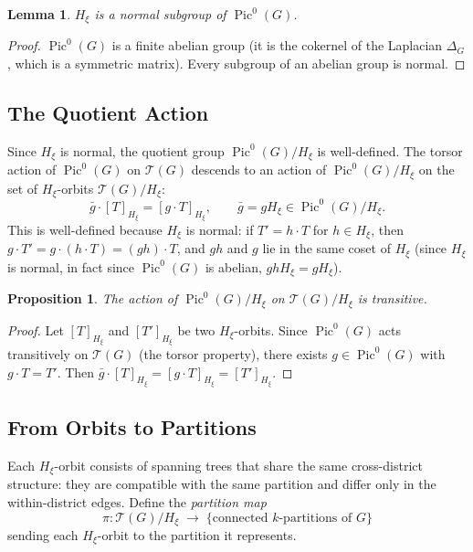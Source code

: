 \documentclass[11pt]{article}
\newtheorem{proposition}{Proposition}[section]
\newtheorem{lemma}{Lemma}[section]
\newcommand{\Pic}{\operatorname{Pic}^0}
\begin{document}
\begin{lemma}\label{lem:normal}
$H_\xi$ is a normal subgroup of $\Pic(G)$.
\end{lemma}

\begin{proof}
$\Pic(G)$ is a finite abelian group (it is the cokernel of the Laplacian
$\Delta_G$, which is a symmetric matrix). Every subgroup of an abelian group
is normal.
\end{proof}

\subsection{The Quotient Action}

Since $H_\xi$ is normal, the quotient group $\Pic(G) / H_\xi$ is
well-defined. The torsor action of $\Pic(G)$ on $\mathcal{T}(G)$ descends to
an action of $\Pic(G) / H_\xi$ on the set of $H_\xi$-orbits
$\mathcal{T}(G) / H_\xi$:
\[
  \bar{g} \cdot [T]_{H_\xi} = [g \cdot T]_{H_\xi},
  \qquad \bar{g} = gH_\xi \in \Pic(G) / H_\xi.
\]
This is well-defined because $H_\xi$ is normal: if $T' = h \cdot T$ for
$h \in H_\xi$, then $g \cdot T' = g \cdot (h \cdot T) = (gh) \cdot T$, and
$gh$ and $g$ lie in the same coset of $H_\xi$ (since $H_\xi$ is normal, in
fact since $\Pic(G)$ is abelian, $ghH_\xi = gH_\xi$).

\begin{proposition}\label{prop:transitive-orbits}
The action of $\Pic(G) / H_\xi$ on $\mathcal{T}(G) / H_\xi$ is transitive.
\end{proposition}

\begin{proof}
Let $[T]_{H_\xi}$ and $[T']_{H_\xi}$ be two $H_\xi$-orbits. Since
$\Pic(G)$ acts transitively on $\mathcal{T}(G)$ (the torsor property), there
exists $g \in \Pic(G)$ with $g \cdot T = T'$. Then
$\bar{g} \cdot [T]_{H_\xi} = [g \cdot T]_{H_\xi} = [T']_{H_\xi}$.
\end{proof}

\subsection{From Orbits to Partitions}

Each $H_\xi$-orbit consists of spanning trees that share the same
cross-district structure: they are compatible with the same partition and
differ only in the within-district edges. Define the \emph{partition map}
\[
  \pi : \mathcal{T}(G) / H_\xi \;\longrightarrow\; \{\text{connected
    $k$-partitions of } G\}
\]
sending each $H_\xi$-orbit to the partition it represents.
\end{document}
